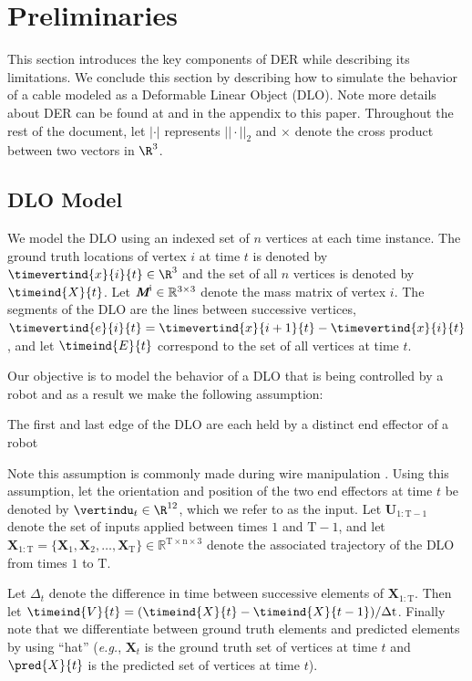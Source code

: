 \section{Preliminaries}
This section introduces the key components of DER while describing its limitations.
We conclude this section by describing how to simulate the behavior of a cable modeled as a Deformable Linear Object (DLO).
Note more details about DER can be found at \cite{originalDER} and in the appendix to this paper.
Throughout the rest of the document, let  $|\cdot|$ represents $||\cdot||_2$ and $\times$ denote the cross product between two vectors in $\R^3$.

\subsection{DLO Model}

We model the DLO using an indexed set of $n$ vertices at each time instance. 
The ground truth locations of vertex $i$ at time $t$ is denoted by $\timevertind{x}{i}{t} \in \R^3$ and the set of all $n$ vertices is denoted by $\timeind{X}{t}$. 
Let $\textit{\textbf{M}}^\text{i}\in \mathbb{R}^{3\times3}$ denote the mass matrix of vertex $i$.
The segments of the DLO are the lines between successive vertices, $\timevertind{e}{i}{t} = \timevertind{x}{i+1}{t} - \timevertind{x}{i}{t}$, and let $\timeind{E}{t}$ correspond to the set of all vertices at time $t$.

Our objective is to model the behavior of a DLO that is being controlled by a robot and as a result we make the following assumption:
\begin{assum}
    The first and last edge of the DLO are each held by a distinct end effector of a robot 
\end{assum}
\noindent Note this assumption is commonly made during wire manipulation \cite{IRP, diminishingridgidity, directionalrigidity, inlstm, gelsim}.
Using this assumption, let the orientation and position of the two end effectors at time $t$ be denoted by $\vertindu_t \in \R^{12}$, which we refer to as the input.
Let $\textbf{U}_{1:\text{T}-1}$ denote the set of inputs applied between times $1$ and $\text{T}-1$, and let $\textbf{X}_{1:\text{T}} =\{\textbf{X}_1, \textbf{X}_2,\ldots, \textbf{X}_\text{T}\} \in \mathbb{R}^{\text{T} \times \text{n}\times 3}$ denote the associated trajectory of the DLO from times $1$ to $\text{T}$.

Let $\Delta_t$ denote the difference in time between successive elements of $\textbf{X}_{1:\text{T}}$.
Then let $\timeind{V}{t}  = (\timeind{X}{t} - \timeind{X}{t-1})/\Delta \text{t}$.
Finally note that we differentiate between ground truth elements and predicted elements by using ``hat'' (\textit{e.g.}, $\textbf{X}_{t}$ is the ground truth set of vertices at time $t$ and $\pred{X}{t}$ is the predicted set of vertices at time $t$).

